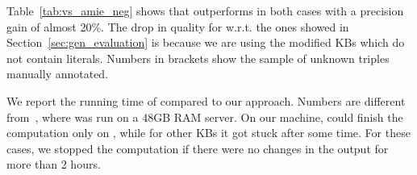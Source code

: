 Table~\ref{tab:vs_amie_neg} shows that \krd outperforms \amie in both cases with a precision gain of almost 20\%. The drop in quality for \krd w.r.t. the ones showed in Section~\ref{sec:gen_evaluation} is because we are using the \amie modified KBs which do not contain literals.
Numbers in brackets show the sample of unknown triples manually annotated. 


We report the running time of \amie compared to our approach. Numbers are different from~\cite{galarraga2015fast}, where \amie was run on a 48GB RAM server. On our machine, \amie could finish the computation only on , while for other KBs it got stuck after some time. For these cases, we stopped the computation if there were no changes in the output for more than 2 hours.

